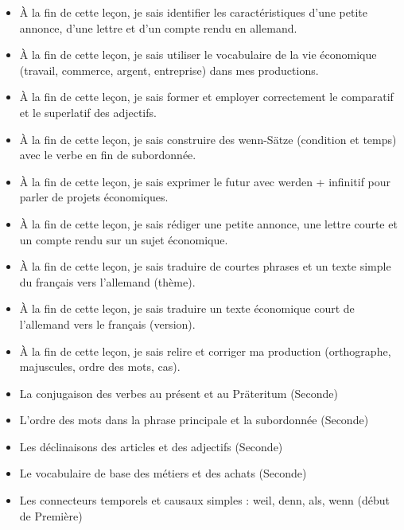 \documentclass[11pt]{article}
\begin{document}
\begin{objectifs}
\begin{itemize}
\item À la fin de cette leçon, je sais identifier les caractéristiques d'une petite annonce, d'une lettre et d'un compte rendu en allemand.
\item À la fin de cette leçon, je sais utiliser le vocabulaire de la vie économique (travail, commerce, argent, entreprise) dans mes productions.
\item À la fin de cette leçon, je sais former et employer correctement le comparatif et le superlatif des adjectifs.
\item À la fin de cette leçon, je sais construire des wenn-Sätze (condition et temps) avec le verbe en fin de subordonnée.
\item À la fin de cette leçon, je sais exprimer le futur avec werden + infinitif pour parler de projets économiques.
\item À la fin de cette leçon, je sais rédiger une petite annonce, une lettre courte et un compte rendu sur un sujet économique.
\item À la fin de cette leçon, je sais traduire de courtes phrases et un texte simple du français vers l'allemand (thème).
\item À la fin de cette leçon, je sais traduire un texte économique court de l'allemand vers le français (version).
\item À la fin de cette leçon, je sais relire et corriger ma production (orthographe, majuscules, ordre des mots, cas).
\end{itemize}
\end{objectifs}

\begin{prerequis}
\begin{itemize}
\item La conjugaison des verbes au présent et au Präteritum (Seconde)
\item L'ordre des mots dans la phrase principale et la subordonnée (Seconde)
\item Les déclinaisons des articles et des adjectifs (Seconde)
\item Le vocabulaire de base des métiers et des achats (Seconde)
\item Les connecteurs temporels et causaux simples : weil, denn, als, wenn (début de Première)
\end{itemize}
\end{prerequis}

\newpage
\end{document}
